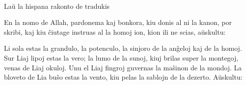 \begin{center}
\footnotesize {}\\[1ex]

La\u u la hispana rakonto de 
 tradukis \\ 
\end{center}

   En la nomo de Allah, pardonema kaj bonkora, kiu donis al ni la kanon,
por skribi, kaj kiu \^ciutage instruas al la homoj ion, kion ili ne
scias, a\u uskultu:

   Li sola estas la grandulo, la potenculo, la sinjoro de la an\^geloj
kaj de la homoj. Sur Liaj lipoj estas la vero; la lumo de la sunoj,
kiuj brilas super la montegoj, venas de Liaj okuloj. Unu el Liaj
fingroj guvernas la ma\^sinon de la mondoj. La bloveto de Lia bu\^so
estas la vento, kiu pelas la sablojn de la dezerto. A\u uskultu:

